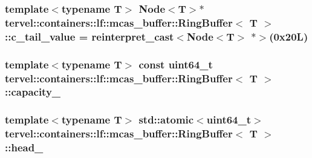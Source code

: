 \subsubsection[{c\+\_\+tail\+\_\+value}]{\setlength{\rightskip}{0pt plus 5cm}template$<$typename T$>$ {\bf Node}$<$T$>$$\ast$ {\bf tervel\+::containers\+::lf\+::mcas\+\_\+buffer\+::\+Ring\+Buffer}$<$ T $>$\+::c\+\_\+tail\+\_\+value = reinterpret\+\_\+cast$<${\bf Node}$<$T$>$ $\ast$$>$(0x20\+L)\hspace{0.3cm}{\ttfamily [private]}}\label{classtervel_1_1containers_1_1lf_1_1mcas__buffer_1_1_ring_buffer_a87837a56d7b80c5fdc81fd3a22c4f470}
\hypertarget{classtervel_1_1containers_1_1lf_1_1mcas__buffer_1_1_ring_buffer_a2dec70fe03eabf7ed3c95fdb4d736364}{}
\subsubsection[{capacity\+\_\+}]{\setlength{\rightskip}{0pt plus 5cm}template$<$typename T$>$ const uint64\+\_\+t {\bf tervel\+::containers\+::lf\+::mcas\+\_\+buffer\+::\+Ring\+Buffer}$<$ T $>$\+::capacity\+\_\+\hspace{0.3cm}{\ttfamily [private]}}\label{classtervel_1_1containers_1_1lf_1_1mcas__buffer_1_1_ring_buffer_a2dec70fe03eabf7ed3c95fdb4d736364}
\hypertarget{classtervel_1_1containers_1_1lf_1_1mcas__buffer_1_1_ring_buffer_aef0ab31a637a528455eacf22dba2ffa4}{}
\subsubsection[{head\+\_\+}]{\setlength{\rightskip}{0pt plus 5cm}template$<$typename T$>$ std\+::atomic$<$uint64\+\_\+t$>$ {\bf tervel\+::containers\+::lf\+::mcas\+\_\+buffer\+::\+Ring\+Buffer}$<$ T $>$\+::head\+\_\+\hspace{0.3cm}{\ttfamily [private]}}\label{classtervel_1_1containers_1_1lf_1_1mcas__buffer_1_1_ring_buffer_aef0ab31a637a528455eacf22dba2ffa4}
\hypertarget{classtervel_1_1containers_1_1lf_1_1mcas__buffer_1_1_ring_buffer_a97b76531afff0036f143fccf090a8cc6}{}
